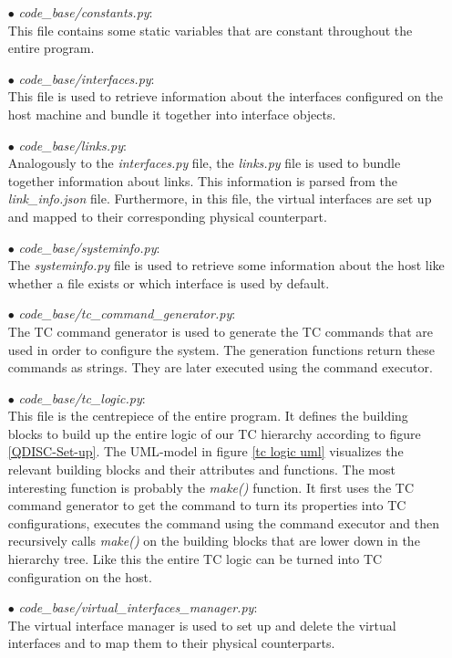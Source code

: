 \begin{enumerate}
\item[$\bullet$]\textit{code\_base/constants.py}:
\\
This file contains some static variables that are constant throughout the entire program. 

\item[$\bullet$]\textit{code\_base/interfaces.py}:
\\
This file is used to retrieve information about the interfaces configured on the host machine and bundle it together into interface objects.

\item[$\bullet$]\textit{code\_base/links.py}:
\\
Analogously to the \textit{interfaces.py} file, the \textit{links.py} file is used to bundle together information about links. This information is parsed from the \textit{link\_info.json} file. Furthermore, in this file, the virtual interfaces are set up and mapped to their corresponding physical counterpart.

\item[$\bullet$]\textit{code\_base/systeminfo.py}:
\\
The \textit{systeminfo.py} file is used to retrieve some information about the host like whether a file exists or which interface is used by default.

\item[$\bullet$]\textit{code\_base/tc\_command\_generator.py}:
\\
The \acs{TC} command generator is used to generate the \acs{TC} commands that are used in order to configure the system. The generation functions return these commands as strings. They are later executed using the command executor.

\item[$\bullet$]\textit{code\_base/tc\_logic.py}:
\\
This file is the centrepiece of the entire program. It defines the building blocks to build up the entire logic of our \acs{TC} hierarchy according to figure \ref{QDISC-Set-up}. The \ac{UML}-model in figure \ref{tc logic uml} visualizes the relevant building blocks and their attributes and functions. The most interesting function is probably the \textit{make()} function. It first uses the \acs{TC} command generator to get the command to turn its properties into \acs{TC} configurations, executes the command using the command executor and then recursively calls \textit{make()} on the building blocks that are lower down in the hierarchy tree. Like this the entire \acs{TC} logic can be turned into \acs{TC} configuration on the host. 

\item[$\bullet$]\textit{code\_base/virtual\_interfaces\_manager.py}:
\\
The virtual interface manager is used to set up and delete the virtual interfaces and to map them to their physical counterparts.

\end{enumerate}

